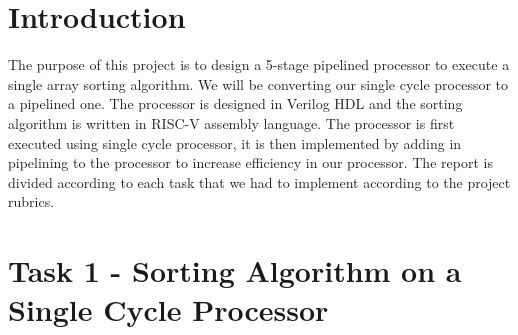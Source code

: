 \documentclass{article}
\begin{document}
\tableofcontents
\newpage

\section{Introduction}
The purpose of this project is to design a 5-stage pipelined processor to execute a single array sorting algorithm. We will be converting our single cycle processor to a pipelined one. The processor is designed in Verilog HDL and the sorting algorithm is written in RISC-V assembly language. The processor is first executed using single cycle processor, it is then implemented by adding in pipelining to the processor to increase efficiency in our processor. The report is divided according to each task that we had to implement according to the project rubrics. 


\section{Task 1 - Sorting Algorithm on a Single Cycle Processor}
\end{document}
